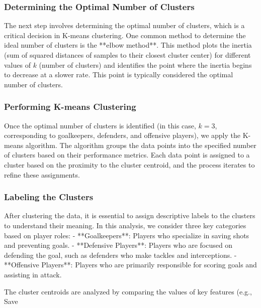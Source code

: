 \documentclass[a4paper,12pt]{article}
\begin{document}
\subsubsection{Determining the Optimal Number of Clusters}

The next step involves determining the optimal number of clusters, which is a critical decision in K-means clustering. One common method to determine the ideal number of clusters is the **elbow method**. This method plots the inertia (sum of squared distances of samples to their closest cluster center) for different values of \( k \) (number of clusters) and identifies the point where the inertia begins to decrease at a slower rate. This point is typically considered the optimal number of clusters.

\subsubsection{Performing K-means Clustering}

Once the optimal number of clusters is identified (in this case, \( k = 3 \), corresponding to goalkeepers, defenders, and offensive players), we apply the K-means algorithm. The algorithm groups the data points into the specified number of clusters based on their performance metrics. Each data point is assigned to a cluster based on the proximity to the cluster centroid, and the process iterates to refine these assignments.

\subsubsection{Labeling the Clusters}

After clustering the data, it is essential to assign descriptive labels to the clusters to understand their meaning. In this analysis, we consider three key categories based on player roles:
- **Goalkeepers**: Players who specialize in saving shots and preventing goals.
- **Defensive Players**: Players who are focused on defending the goal, such as defenders who make tackles and interceptions.
- **Offensive Players**: Players who are primarily responsible for scoring goals and assisting in attack.

The cluster centroids are analyzed by comparing the values of key features (e.g., Save%
\end{document}
